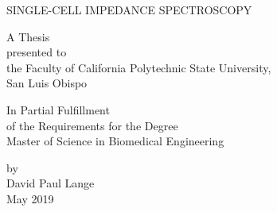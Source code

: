 \begin{titlepage}
\begin{center}
\vspace*{1cm}

\large SINGLE-CELL IMPEDANCE SPECTROSCOPY

\vfill

A Thesis\\
presented to\\
the Faculty of California Polytechnic State University,\\
San Luis Obispo\\

\vfill

In Partial Fulfillment\\
of the Requirements for the Degree\\
Master of Science in Biomedical Engineering\\

\vspace{0.75 in}

by\\
David Paul Lange\\
May 2019
\vspace{1.5 in}
    
    
\end{center}
\end{titlepage}